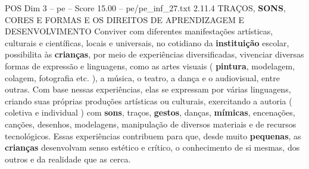 \begin{textsample}{POS Dim 3 – pe – Score 15.00 – pe/pe\_inf\_27.txt}  \label{ex:f3_pos_278}
2.11.4 TRAÇOS, \textbf{SONS}, CORES E FORMAS E OS DIREITOS DE APRENDIZAGEM E DESENVOLVIMENTO Conviver com diferentes manifestações artísticas, culturais e científicas, locais e universais, no cotidiano da \textbf{instituição} escolar, possibilita às \textbf{crianças}, por meio de experiências diversificadas, vivenciar diversas formas de expressão e linguagens, como as artes visuais ( \textbf{pintura}, modelagem, colagem, fotografia etc. ), a música, o teatro, a dança e o audiovisual, entre outras.
Com base nessas experiências, elas se expressam por várias linguagens, criando suas próprias produções artísticas ou culturais, exercitando a autoria ( coletiva e individual ) com \textbf{sons}, traços, \textbf{gestos}, danças, \textbf{mímicas}, encenações, canções, desenhos, modelagens, manipulação de diversos materiais e de recursos tecnológicos.
Essas experiências contribuem para que, desde muito \textbf{pequenas}, as \textbf{crianças} desenvolvam senso estético e crítico, o conhecimento de si mesmas, dos outros e da realidade que as cerca.

\end{textsample}
